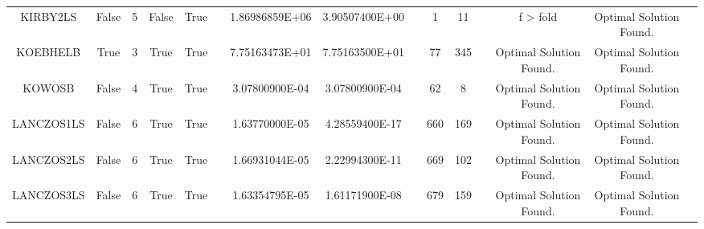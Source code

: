 \begin{longtable}{ccccccccccccccc}
	\cellcolor{default2} KIRBY2LS& \cellcolor{default2} False& \cellcolor{default2} 5& \cellcolor{default2} False& \cellcolor{default2} True& \cellcolor{header} & \cellcolor{poor} 1.86986859E+06& \cellcolor{best} 3.90507400E+00& \cellcolor{header} & \cellcolor{best} 1& \cellcolor{poor} 11& \cellcolor{header} & \cellcolor{default2} f > fold& \cellcolor{default2} Optimal Solution Found.& \cellcolor{header} \\
	\cellcolor{default1} KOEBHELB& \cellcolor{default1} True& \cellcolor{default1} 3& \cellcolor{default1} True& \cellcolor{default1} True& \cellcolor{header} & \cellcolor{best} 7.75163473E+01& \cellcolor{ok} 7.75163500E+01& \cellcolor{header} & \cellcolor{best} 77& \cellcolor{poor} 345& \cellcolor{header} & \cellcolor{default1} Optimal Solution Found.& \cellcolor{default1} Optimal Solution Found.& \cellcolor{header} \\
	\cellcolor{default2} KOWOSB& \cellcolor{default2} False& \cellcolor{default2} 4& \cellcolor{default2} True& \cellcolor{default2} True& \cellcolor{header} & \cellcolor{best} 3.07800900E-04& \cellcolor{best} 3.07800900E-04& \cellcolor{header} & \cellcolor{poor} 62& \cellcolor{best} 8& \cellcolor{header} & \cellcolor{default2} Optimal Solution Found.& \cellcolor{default2} Optimal Solution Found.& \cellcolor{header} \\
	\cellcolor{default1} LANCZOS1LS& \cellcolor{default1} False& \cellcolor{default1} 6& \cellcolor{default1} True& \cellcolor{default1} True& \cellcolor{header} & \cellcolor{ok} 1.63770000E-05& \cellcolor{best} 4.28559400E-17& \cellcolor{header} & \cellcolor{poor} 660& \cellcolor{best} 169& \cellcolor{header} & \cellcolor{default1} Optimal Solution Found.& \cellcolor{default1} Optimal Solution Found.& \cellcolor{header} \\
	\cellcolor{default2} LANCZOS2LS& \cellcolor{default2} False& \cellcolor{default2} 6& \cellcolor{default2} True& \cellcolor{default2} True& \cellcolor{header} & \cellcolor{ok} 1.66931044E-05& \cellcolor{best} 2.22994300E-11& \cellcolor{header} & \cellcolor{poor} 669& \cellcolor{best} 102& \cellcolor{header} & \cellcolor{default2} Optimal Solution Found.& \cellcolor{default2} Optimal Solution Found.& \cellcolor{header} \\
	\cellcolor{default1} LANCZOS3LS& \cellcolor{default1} False& \cellcolor{default1} 6& \cellcolor{default1} True& \cellcolor{default1} True& \cellcolor{header} & \cellcolor{ok} 1.63354795E-05& \cellcolor{best} 1.61171900E-08& \cellcolor{header} & \cellcolor{poor} 679& \cellcolor{best} 159& \cellcolor{header} & \cellcolor{default1} Optimal Solution Found.& \cellcolor{default1} Optimal Solution Found.& \cellcolor{header} \\

\end{longtable}
